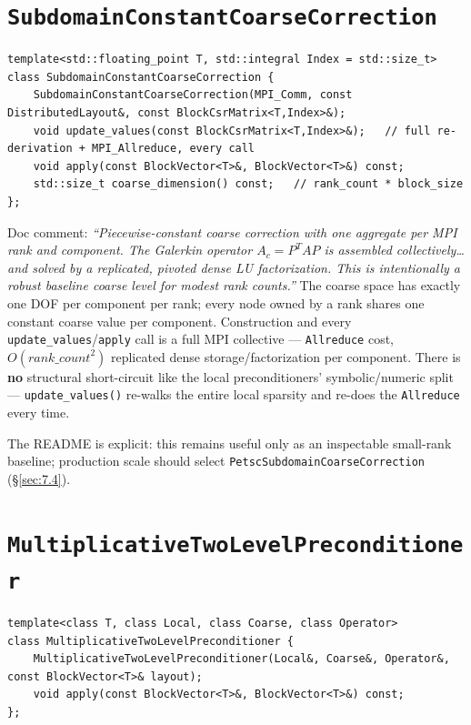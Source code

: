 \documentclass[11pt,a4paper]{report}
\newcommand{\secref}[1]{\S\ref{#1}}
\begin{document}
\section{\texorpdfstring{\lstinline!SubdomainConstantCoarseCorrection!}{SubdomainConstantCoarseCorrection}}
\label{sec:7.1}

\begin{lstlisting}
template<std::floating_point T, std::integral Index = std::size_t>
class SubdomainConstantCoarseCorrection {
    SubdomainConstantCoarseCorrection(MPI_Comm, const DistributedLayout&, const BlockCsrMatrix<T,Index>&);
    void update_values(const BlockCsrMatrix<T,Index>&);   // full re-derivation + MPI_Allreduce, every call
    void apply(const BlockVector<T>&, BlockVector<T>&) const;
    std::size_t coarse_dimension() const;   // rank_count * block_size
};
\end{lstlisting}

Doc comment: \emph{``Piecewise-constant coarse correction with one
aggregate per MPI rank and component. The Galerkin operator
$A_c = P^T A P$ is assembled collectively\ldots and solved by a
replicated, pivoted dense LU factorization. This is intentionally a
robust baseline coarse level for modest rank counts.''} The coarse
space has exactly one DOF per component per rank; every node owned by
a rank shares one constant coarse value per component. Construction
and every \lstinline!update_values!/\lstinline!apply! call is a full MPI collective ---
\lstinline!Allreduce! cost, $O(\mathit{rank\_count}^2)$ replicated dense
storage/factorization per component. There is \textbf{no} structural
short-circuit like the local preconditioners' symbolic/numeric split
--- \lstinline!update_values()! re-walks the entire local sparsity and
re-does the \lstinline!Allreduce! every time.

The README is explicit: this remains useful only as an inspectable
small-rank baseline; production scale should select
\lstinline!PetscSubdomainCoarseCorrection! (\secref{sec:7.4}).

\section{\texorpdfstring{\lstinline!MultiplicativeTwoLevelPreconditioner!}{MultiplicativeTwoLevelPreconditioner}}
\label{sec:7.2}

\begin{lstlisting}
template<class T, class Local, class Coarse, class Operator>
class MultiplicativeTwoLevelPreconditioner {
    MultiplicativeTwoLevelPreconditioner(Local&, Coarse&, Operator&, const BlockVector<T>& layout);
    void apply(const BlockVector<T>&, BlockVector<T>&) const;
};
\end{lstlisting}
\end{document}
